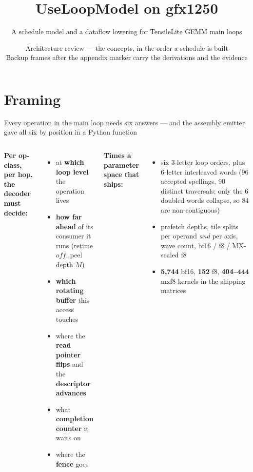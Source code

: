 \documentclass[aspectratio=169,9pt]{beamer}
\title{UseLoopModel on gfx1250}
\subtitle{A schedule model and a dataflow lowering for TensileLite GEMM main loops}
\date{}
\author{Architecture review --- the concepts, in the order a schedule is built\\[2pt]
{\footnotesize\color{gray}Backup frames after the appendix marker carry the derivations and the evidence}}
\newcommand{\tsub}[1]{{\footnotesize\color{gray}#1}}
\newcommand{\key}[1]{\textcolor{acc}{\textbf{#1}}}
\begin{document}
\maketitle
\section{Framing}
\begin{frame}{Every operation in the main loop needs six answers --- and the assembly emitter gave all six by position in a Python function}

\begin{center}
\end{center}

\begin{columns}[T]
{\scriptsize \textbf{Per op-class, per hop, the decoder must decide:}}
\begin{itemize}\scriptsize
  \item at \key{which loop level} the operation lives
  \item \key{how far ahead} of its consumer it runs \tsub{(retime $\mathit{off}$, peel depth $M$)}
  \item \key{which rotating buffer} this access touches
  \item where the \key{read pointer flips} and the \key{descriptor advances}
  \item what \key{completion counter} it waits on
  \item where the \key{fence} goes
\end{itemize}

{\scriptsize \textbf{Times a parameter space that ships:}}
\begin{itemize}\scriptsize
  \item six 3-letter loop orders, plus 6-letter interleaved words \tsub{(96 accepted spellings, 90 distinct traversals; only the 6 doubled words collapse, so 84 are non-contiguous)}
  \item prefetch depths, tile splits per operand \emph{and} per axis, wave count, bf16 / f8 / MX-scaled f8
  \item \key{5{,}744} bf16, \key{152} f8, \key{404--444} mxf8 kernels in the shipping matrices
\end{itemize}
\end{columns}


\end{frame}
\end{document}
